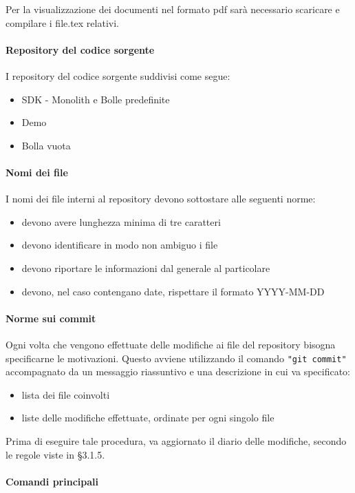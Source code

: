 Per la visualizzazione dei documenti nel formato pdf sarà necessario scaricare e compilare i file.tex relativi.


\paragraph{Repository del codice sorgente}
I  repository del codice sorgente suddivisi come segue:

\begin{itemize}
	\item SDK - Monolith e Bolle predefinite
	\item Demo
	\item Bolla vuota
\end{itemize}

\paragraph{Nomi dei file}  
I nomi dei file interni al repository devono sottostare alle seguenti norme:
\begin{itemize}
	\item devono avere lunghezza minima di tre caratteri
	\item devono identificare in modo non ambiguo i file
	\item devono riportare le informazioni dal generale al particolare
	\item devono, nel caso contengano date, rispettare il formato YYYY-MM-DD
\end{itemize}

\paragraph{Norme sui commit}
Ogni volta che vengono effettuate delle modifiche ai file del
repository bisogna specificarne le motivazioni. Questo avviene utilizzando il comando
\texttt{"git commit"} accompagnato da un messaggio riassuntivo e una descrizione in cui va specificato: 
\begin{itemize}
	\item lista dei file coinvolti
	\item liste delle modifiche effettuate, ordinate per ogni singolo file
\end{itemize}
Prima di eseguire tale procedura, va aggiornato il diario delle modifiche, secondo le regole viste in \S 3.1.5.

\paragraph{Comandi principali}

